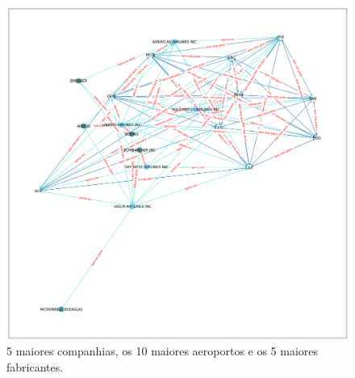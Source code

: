\documentclass{article}
\begin{document}
\begin{figure}[H]
    \centering
    \includegraphics[width = \textwidth]{Imagens/5-10-5.png}
    \caption{5 maiores companhias, os 10 maiores aeroportos e os 5 maiores fabricantes.}
    \label{view5}
\end{figure}

\printbibliography
\end{document}
